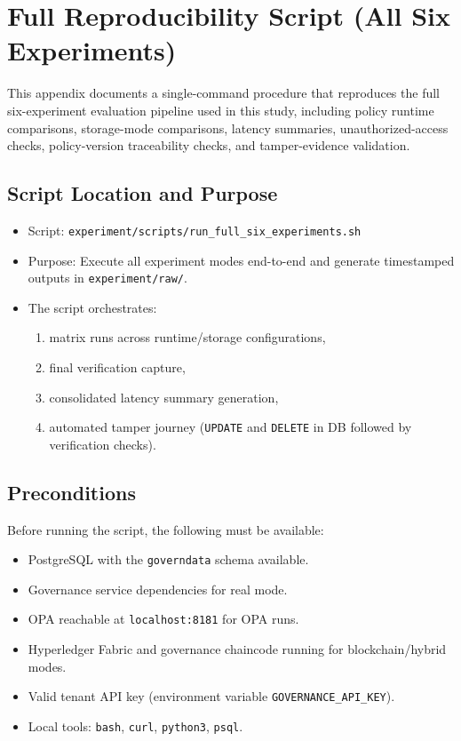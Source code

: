 \section{Full Reproducibility Script (All Six Experiments)}

This appendix documents a single-command procedure that reproduces the full six-experiment evaluation pipeline used in this study, including policy runtime comparisons, storage-mode comparisons, latency summaries, unauthorized-access checks, policy-version traceability checks, and tamper-evidence validation.

\subsection{Script Location and Purpose}

\begin{itemize}
  \item Script: \texttt{experiment/scripts/run\_full\_six\_experiments.sh}
  \item Purpose: Execute all experiment modes end-to-end and generate timestamped outputs in \texttt{experiment/raw/}.
  \item The script orchestrates:
    \begin{enumerate}
      \item matrix runs across runtime/storage configurations,
      \item final verification capture,
      \item consolidated latency summary generation,
      \item automated tamper journey (\texttt{UPDATE} and \texttt{DELETE} in DB followed by verification checks).
    \end{enumerate}
\end{itemize}

\subsection{Preconditions}

Before running the script, the following must be available:
\begin{itemize}
  \item PostgreSQL with the \texttt{governdata} schema available.
  \item Governance service dependencies for real mode.
  \item OPA reachable at \texttt{localhost:8181} for OPA runs.
  \item Hyperledger Fabric and governance chaincode running for blockchain/hybrid modes.
  \item Valid tenant API key (environment variable \texttt{GOVERNANCE\_API\_KEY}).
  \item Local tools: \texttt{bash}, \texttt{curl}, \texttt{python3}, \texttt{psql}.
\end{itemize}

